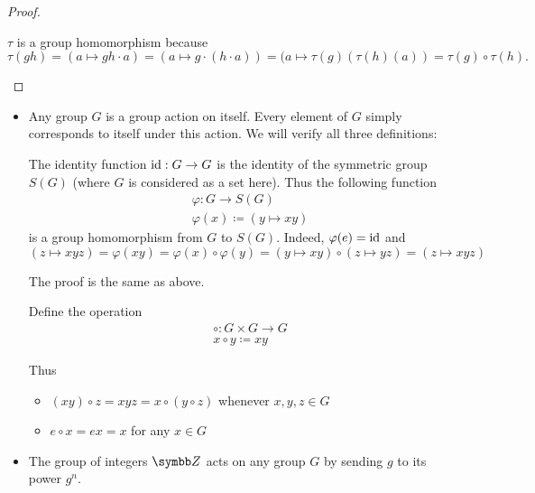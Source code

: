 \begin{proof}
\begin{description}
    \( \tau \) is a group homomorphism because
    \begin{equation*}
      \tau(g h)
      =
      (a \mapsto gh \cdot a)
      =
      (a \mapsto g \cdot (h \cdot a))
      =
      (a \mapsto \tau(g)(\tau(h)(a))
      =
      \tau(g) \circ \tau(h).
    \end{equation*}
  \end{description}
\end{proof}

\begin{example}\label{ex:group_actions}
  \begin{itemize}\mbox{}
    \item Any group \( G \) is a group action on itself. Every element of \( G \) simply corresponds to itself under this action. We will verify all three definitions:
    \begin{description}
       The identity function \( \operatorname{id}: G \to G \) is the identity of the symmetric group \( S(G) \) (where \( G \) is considered as a set here). Thus the following function
      \begin{align*}
        &\varphi: G \to S(G) \\
        &\varphi(x) \coloneqq (y \mapsto xy)
      \end{align*}
      is a group homomorphism from \( G \) to \( S(G) \). Indeed, \( \varphi(e) = \operatorname{id} \) and
      \begin{equation*}
        (z \mapsto xyz) = \varphi(xy) = \varphi(x) \circ \varphi(y) = (y \mapsto xy) \circ (z \mapsto yz) = (z \mapsto xyz)
      \end{equation*}

       The proof is the same as above.

       Define the operation
      \begin{align*}
        &\circ: G \times G \to G \\
        &x \circ y \coloneqq xy
      \end{align*}

      Thus
      \begin{itemize}
        \item \( (x y) \circ z = xyz = x \circ (y \circ z) \) whenever \( x, y, z \in G \)
        \item \( e \circ x = ex = x \) for any \( x \in G \)
      \end{itemize}
    \end{description}

    \item The group of integers \( \BZ \) acts on any group \( G \) by sending \( g \) to its power \( g^n \).
  \end{itemize}
\end{example}

